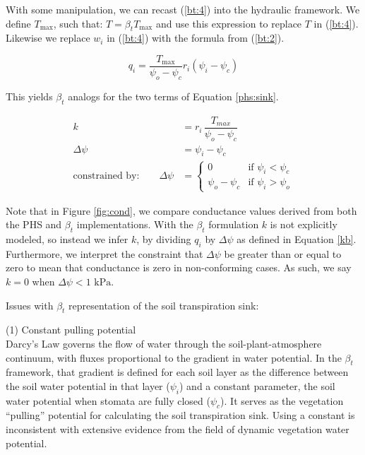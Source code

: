 \documentclass[draft,linenumbers]{agujournal}
\begin{document}
    With some manipulation, we can recast (\ref{bt:4}) into the hydraulic framework. We define $T_{\text{max}}$, such that: $T = 
    \beta_t T_{\text{max}}$ and use this expression to replace $T$ in (\ref{bt:4}).  Likewise we replace $w_i$ in (\ref{bt:4}) with the 
    formula from (\ref{bt:2}).
    
    \begin{linenomath*}
    \begin{equation} 
    q_i = \dfrac{T_{\text{max}}}{\psi_{o}-\psi_{c}} r_i \left(\psi_i-\psi_{c} \right)
    \end{equation}
    \end{linenomath*}
    
    This yields $\beta_t$ analogs for the two terms of Equation \ref{phs:sink}.
    \begin{linenomath*}
    \begin{equation} \begin{aligned}
    k &= r_i \, \dfrac{T_{max}}{\psi_{o}-\psi_{c}} \\
    \Delta\psi &= \psi_i - \psi_{c} \\
    \mbox{constrained by:} \qquad
    \Delta\psi &=
    \begin{cases}
    0                          & \text{if } \psi_i<\psi_{c}  \\
    \psi_{o}-\psi_{c} & \text{if } \psi_i>\psi_{o}
    \label{kb}
    \end{cases}
    \end{aligned}\end{equation}
    \end{linenomath*}
    
    Note that in Figure \ref{fig:cond}, we compare conductance values derived from both the PHS and $\beta_t$ implementations.
    With the $\beta_t$ formulation $k$ is not explicitly modeled, so instead we infer $k$, 
    by dividing $q_i$ by $\Delta\psi$ as defined in Equation \ref{kb}.
    Furthermore, we interpret the constraint that $\Delta\psi$ be greater than or equal to zero to mean 
    that conductance is zero in non-conforming cases. As such, we say $k=0$ when $\Delta\psi<\text{1 kPa}$.
    
    Issues with $\beta_t$ representation of the soil transpiration sink: 
    
    (1) Constant pulling potential \\
    Darcy's Law governs the flow of water through the soil-plant-atmosphere continuum, 
    with fluxes proportional to the gradient in water potential. 
    In the $\beta_t$ framework, that gradient is defined for each soil layer as 
    the difference between the soil water potential in that layer ($\psi_i$) 
    and a constant parameter, the soil water potential when stomata are fully closed ($\psi_{c}$).
    It serves as the vegetation ``pulling'' potential for calculating the soil transpiration sink.
    Using a constant is inconsistent with extensive evidence from the field of dynamic vegetation water potential.
    
\end{document}
